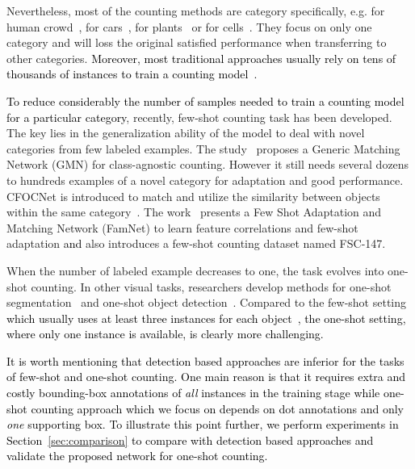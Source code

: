 \documentclass{article}
\newcommand\hui[1]{\textcolor{black}{#1}}%
\newcommand\XP[1]{\textcolor{black}{#1}}%
\begin{document}
Nevertheless, most of the counting methods are category specifically, e.g. for human crowd~\cite{zhang2016single, ma2019bayesian, cao2018scale, liu2019context, wang2020distribution, lin2021direct}, for cars~\cite{biswas2017automatic, moranduzzo2013automatic}, for plants~\cite{machefer2020mask} or for cells~\cite{falk2019u, xie2018microscopy}. They focus on only one category and will loss the original satisfied performance when transferring to other categories. \XP{Moreover, most traditional approaches usually rely on tens of thousands of instances to train a counting model~\cite{ma2019bayesian, cao2018scale, liu2019context, lin2021direct, biswas2017automatic, moranduzzo2013automatic}.} 

\XP{To reduce considerably the number of samples needed to train a counting model} \hui{for a particular category}, recently, few-shot counting task has been developed. The key lies in the generalization ability of the model to deal with novel categories from few labeled examples. The study~\cite{lu2018class} proposes a Generic Matching Network (GMN) for class-agnostic counting. However it still needs several dozens to hundreds examples of a novel category for adaptation and good performance. CFOCNet is introduced to match and utilize the similarity between objects within the same category~\cite{yang2021class}. The work~\cite{ranjan2021learning} presents a Few Shot Adaptation and Matching Network (FamNet) to learn feature correlations and few-shot adaptation \XP{and} also introduces a few-shot counting dataset named FSC-147.

When the number of labeled example decreases to one, the task evolves into one-shot counting. In other visual tasks, researchers develop methods for one-shot segmentation~\cite{michaelis2018one} and one-shot object detection~\cite{hsieh2019one, li2020one}. Compared to the few-shot setting \XP{which usually uses at least three instances for each object~\cite{ranjan2021learning}, the one-shot setting, where only one instance is available, is clearly more challenging.} 

\XP{It is worth mentioning that detection based approaches \cite{lin2017focal, ren2015faster, he2017mask} are inferior for the tasks of few-shot and one-shot counting. One main reason is that it requires extra and costly bounding-box annotations of \emph{all} instances in the training stage while \XP{one-shot counting approach which we focus on} depends on dot annotations and only \emph{one} supporting box. To illustrate this point further, 
we perform experiments in Section~\ref{sec:comparison} to compare with detection based approaches and validate the proposed network for one-shot counting.}
\end{document}
